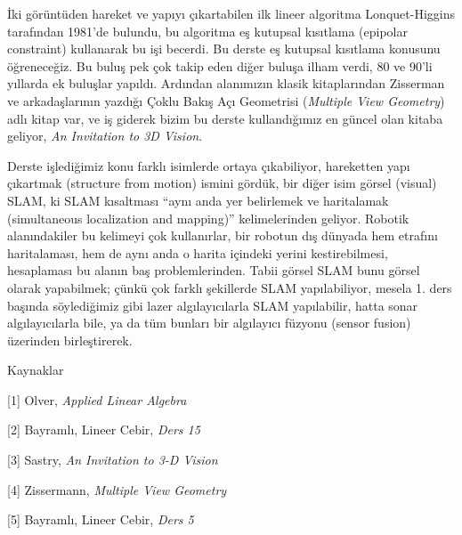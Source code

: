 \documentclass[12pt,fleqn]{article}\usepackage{../../common}
\begin{document}
İki görüntüden hareket ve yapıyı çıkartabilen ilk lineer algoritma
Lonquet-Higgins tarafından 1981'de bulundu, bu algoritma eş kutupsal
kısıtlama (epipolar constraint) kullanarak bu işi becerdi. Bu derste eş
kutupsal kısıtlama konusunu öğreneceğiz. Bu buluş pek çok takip eden diğer
buluşa ilham verdi, 80 ve 90'li yıllarda ek buluşlar yapıldı. Ardından
alanımızın klasik kitaplarından Zisserman ve arkadaşlarının yazdığı Çoklu
Bakış Açı Geometrisi ({\em Multiple View Geometry}) adlı kitap var, ve iş
giderek bizim bu derste kullandığımız en güncel olan kitaba geliyor, 
{\em An Invitation to 3D Vision}. 

Derste işlediğimiz konu farklı isimlerde ortaya çıkabiliyor, hareketten
yapı çıkartmak (structure from motion) ismini gördük, bir diğer isim görsel
(visual) SLAM, ki SLAM kısaltması ``aynı anda yer belirlemek ve haritalamak
(simultaneous localization and mapping)'' kelimelerinden geliyor. Robotik
alanındakiler bu kelimeyi çok kullanırlar, bir robotun dış dünyada hem
etrafını haritalaması, hem de aynı anda o harita içindeki yerini
kestirebilmesi, hesaplaması bu alanın baş problemlerinden. Tabii görsel
SLAM bunu görsel olarak yapabilmek; çünkü çok farklı şekillerde SLAM
yapılabiliyor, mesela 1. ders başında söylediğimiz gibi lazer
algılayıcılarla SLAM yapılabilir, hatta sonar algılayıcılarla bile, ya da
tüm bunları bir algılayıcı füzyonu (sensor fusion) üzerinden birleştirerek.


Kaynaklar 

[1] Olver, {\em Applied Linear Algebra}

[2] Bayramlı, Lineer Cebir, {\em Ders 15}

[3] Sastry, {\em An Invitation to 3-D Vision}

[4] Zissermann, {\em Multiple View Geometry}

[5] Bayramlı, Lineer Cebir, {\em Ders 5}
\end{document}
